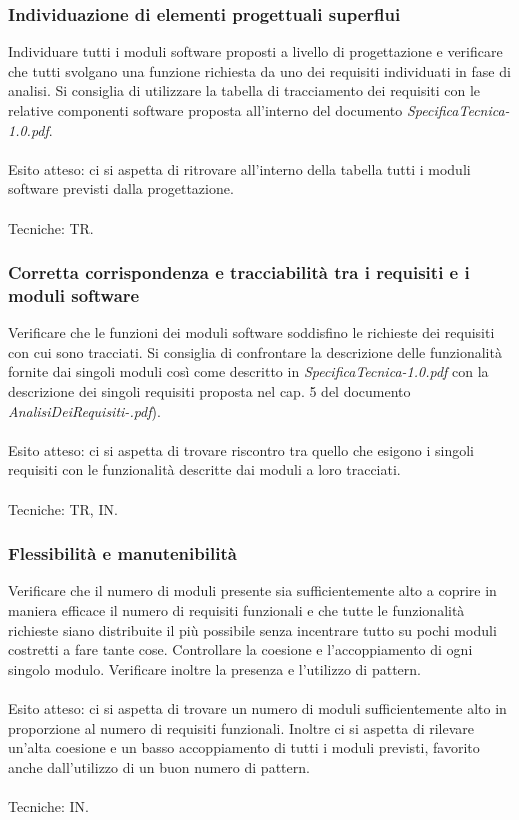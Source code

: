 \subsubsection{Individuazione di elementi progettuali superflui}

Individuare tutti i moduli software proposti a livello di progettazione e
verificare che tutti svolgano una funzione richiesta da uno dei requisiti individuati in fase
di analisi. Si consiglia di utilizzare la tabella di tracciamento dei requisiti
con le relative componenti software proposta all'interno del documento
\emph{SpecificaTecnica-1.0.pdf}.
\\\\
Esito atteso: ci si aspetta di ritrovare all'interno della tabella tutti i
moduli software previsti dalla progettazione.
\\\\
Tecniche: TR.

\subsubsection{Corretta corrispondenza e tracciabilit\`a tra i requisiti e i
moduli software}

Verificare che le funzioni dei moduli software soddisfino le richieste dei
requisiti con cui sono tracciati. Si consiglia di confrontare la descrizione
delle funzionalit\`a fornite dai singoli moduli cos\`i come descritto in
\emph{SpecificaTecnica-1.0.pdf} con la descrizione dei singoli requisiti
proposta nel cap. 5 del documento \emph{AnalisiDeiRequisiti-\versioneAR.pdf}).
\\\\
Esito atteso: ci si aspetta di trovare riscontro tra quello che esigono i
singoli requisiti con le funzionalit\`a descritte dai moduli a loro tracciati.
\\\\
Tecniche: TR, IN.


\subsubsection{Flessibilit\`a e manutenibilit\`a}

Verificare che il numero di moduli presente sia sufficientemente alto a coprire
in maniera efficace il numero di requisiti funzionali e che tutte le
funzionalit\`a richieste siano distribuite il pi\`u possibile senza incentrare
tutto su pochi moduli costretti a fare tante cose. Controllare la coesione e
l'accoppiamento di ogni singolo modulo. Verificare inoltre la presenza e
l'utilizzo di pattern.
\\\\
Esito atteso: ci si aspetta di trovare un numero di moduli sufficientemente alto
in proporzione al numero di requisiti funzionali. Inoltre ci si aspetta di
rilevare un'alta coesione e un basso accoppiamento di tutti i moduli previsti,
favorito anche dall'utilizzo di un buon numero di pattern. 
\\\\
Tecniche: IN.


